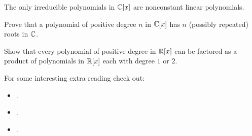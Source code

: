 \documentclass{ximera}
\begin{document}
\begin{corollary}
  The only irreducible polynomials in $\mathbb C[x]$ are nonconstant linear
  polynomials.
\end{corollary}

\begin{exercise} 
Prove that a polynomial of positive degree $n$ in $\mathbb C[x]$ has $n$
(possibly repeated) roots in $\mathbb C$.
\end{exercise}


\begin{exercise}\label{E:RQ} 
Show that every polynomial of positive degree in $\mathbb R[x]$ can be
factored as a product of polynomials in $\mathbb R[x]$ each with degree $1$
or $2$.
\end{exercise}




For some interesting extra reading check out:
\begin{itemize}
\item {}.
\item {}.
\item {}.
\end{itemize}
\end{document}
